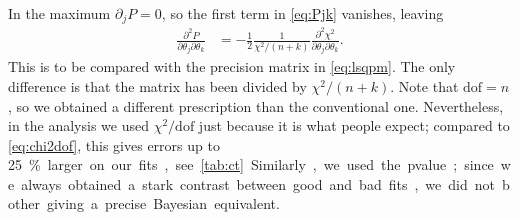 In the maximum $\partial_j P = 0$, so the first term in \eqref{eq:Pjk}
vanishes, leaving
%
\begin{align}
    \frac {\partial^2 P} {\partial\theta_j \partial\theta_k}
    &= -\frac12 \frac 1 {\chi^2/(n+k)}
    \frac {\partial^2 \chi^2} {\partial\theta_j \partial\theta_k}.
    \label{eq:chi2dof}
\end{align}
%
This is to be compared with the precision matrix in \eqref{eq:lsqpm}. The
only difference is that the matrix has been divided by $\chi^2/(n+k)$. Note
that $\mathrm{dof} = n$, so we obtained a different prescription than the
conventional one. Nevertheless, in the analysis we used $\chi^2/\mathrm{dof}$
just because it is what people expect; compared to \eqref{eq:chi2dof}, this
gives errors up to \SI{25}\% larger on our fits, see \autoref{tab:ct}.

Similarly, we used the pvalue; since we always obtained a stark contrast
between good and bad fits, we did not bother giving a precise Bayesian
equivalent.
